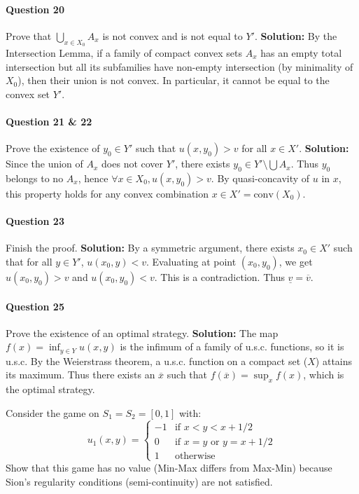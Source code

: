 \paragraph{Question 20} Prove that $\bigcup_{x \in X_0} A_x$ is not convex and is not equal to $Y'$.
\textbf{Solution:} By the Intersection Lemma, if a family of compact convex sets $A_x$ has an empty total intersection but all its subfamilies have non-empty intersection (by minimality of $X_0$), then their union is not convex. In particular, it cannot be equal to the convex set $Y'$.

\paragraph{Question 21 \& 22} Prove the existence of $y_0 \in Y'$ such that $u(x, y_0) > v$ for all $x \in X'$.
\textbf{Solution:} Since the union of $A_x$ does not cover $Y'$, there exists $y_0 \in Y' \setminus \bigcup A_x$. Thus $y_0$ belongs to no $A_x$, hence $\forall x \in X_0, u(x, y_0) > v$. By quasi-concavity of $u$ in $x$, this property holds for any convex combination $x \in X' = \text{conv}(X_0)$.

\paragraph{Question 23} Finish the proof.
\textbf{Solution:} By a symmetric argument, there exists $x_0 \in X'$ such that for all $y \in Y'$, $u(x_0, y) < v$. Evaluating at point $(x_0, y_0)$, we get $u(x_0, y_0) > v$ and $u(x_0, y_0) < v$. This is a contradiction. Thus $\underline{v} = \overline{v}$.

\paragraph{Question 25} Prove the existence of an optimal strategy.
\textbf{Solution:} The map $f(x) = \inf_{y \in Y} u(x,y)$ is the infimum of a family of u.s.c. functions, so it is u.s.c. By the Weierstrass theorem, a u.s.c. function on a compact set ($X$) attains its maximum. Thus there exists an $\overline{x}$ such that $f(\overline{x}) = \sup_x f(x)$, which is the optimal strategy.

\begin{exercice}
Consider the game on $S_1 = S_2 = [0,1]$ with:
$$u_1(x,y) = \begin{cases} -1 & \text{if } x < y < x + 1/2 \\ 0 & \text{if } x = y \text{ or } y = x + 1/2 \\ 1 & \text{otherwise} \end{cases}$$
Show that this game has no value (Min-Max differs from Max-Min) because Sion's regularity conditions (semi-continuity) are not satisfied.
\end{exercice}


